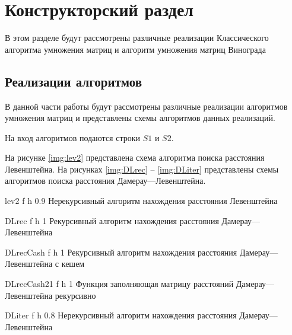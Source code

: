 \chapter{Конструкторский раздел}



В этом разделе будут рассмотрены различные реализации Классического алгоритма умножения матриц и алгоритм умножения матриц
Винограда


\section{Реализации алгоритмов}

В данной части работы будут рассмотрены различные реализации алгоритмов
умножения матриц и представлены схемы алгоритмов данных реализаций.

На вход алгоритмов подаются строки $S1$ и $S2$.

На рисунке \ref{img:lev2} представлена схема алгоритма поиска расстояния Левенштейна. На рисунках \ref{img:DLrec} -- \ref{img:DLiter} представлены схемы алгоритмов поиска расстояния Дамерау---Левенштейна.

{lev2} %
{f} %
{h} %
{0.9\textwidth} %
{Нерекурсивный алгоритм нахождения расстояния Левенштейна} %

{DLrec} %
{f} %
{h} %
{1\textwidth} %
{Рекурсивный алгоритм нахождения расстояния Дамерау---Левенштейна} %

{DLrecCash} %
{f} %
{h} %
{1\textwidth} %
{Рекурсивный алгоритм нахождения расстояния Дамерау---Левенштейна с кешем} %

{DLrecCash21} %
{f} %
{h} %
{1\textwidth} %
{Функция заполняющая матрицу расстояний Дамерау---Левенштейна рекурсивно} %


{DLiter} %
{f} %
{h} %
{0.8\textwidth} %
{Нерекурсивный алгоритм нахождения расстояния Дамерау---Левенштейна} %


